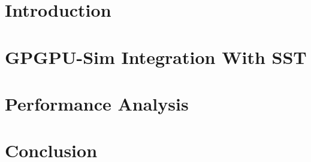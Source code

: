\documentclass[pdf,ps2pdf,12pt,report,strict,blank,justified]{SANDreport}
\begin{document}
%


    \SANDmain           %

   \chapter{Introduction}
      \label{ch:intro}
      

   \chapter{GPGPU-Sim Integration With SST}
      \label{ch:integration}
      

   \chapter{Performance Analysis}
      \label{sec:performance}
      

   \chapter{Conclusion}
      

    \nocite{*}
\end{document}
